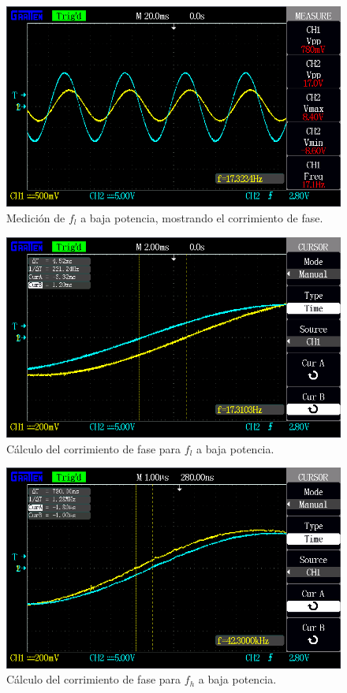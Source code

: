 \begin{figure}[H]
    \centering
    \includegraphics[width=0.95 \textwidth]{./img/mediciones/BW_low_power/1.png}
    \caption{Medición de $f_{l}$ a baja potencia, mostrando el corrimiento de fase.}
    \label{fig:BW_low_power_fl}
\end{figure}


\vfill
\clearpage

\begin{figure}[H]
    \centering
    \includegraphics[width=0.95 \textwidth]{./img/mediciones/BW_low_power/3.png}
    \caption{Cálculo del corrimiento de fase para $f_{l}$ a baja potencia.}
    \label{fig:BW_low_power_fl_phase}
\end{figure}

\begin{figure}[H]
    \centering
    \includegraphics[width=0.95 \textwidth]{./img/mediciones/BW_low_power/4.png}
    \caption{Cálculo del corrimiento de fase para $f_{h}$ a baja potencia.}
    \label{fig:BW_low_power_fh_phase}
\end{figure}

